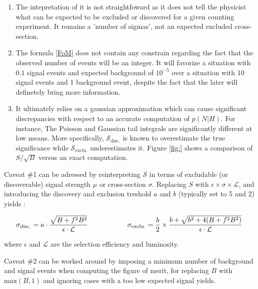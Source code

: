     \begin{enumerate}
        \item The intepretation of it is not straightfoward as it does not tell the 
              physicist what can be expected to be excluded or discovered 
              for a given counting experiment. It remains a 'number of sigmas', not an 
              expected excluded cross-section.
        \item The formula \ref{FoM} does not contain any constrain regarding the fact that
              the observed number of events will be an integer. It will favorize a situation
              with $0.1$ signal events and expected background of $10^{-5}$ over a 
              situation with 10 signal events and 1 background event, despite the fact that
              the later will definetely bring more information.
        \item It ultimately relies on a gaussian approximation which can cause significant
              discrepancies with respect to an accurate computation of $p(N|H)$. For instance,
              The Poisson and Gaussian tail integrals are significantly different at low
              means. More specifically, $\mathcal{S}_\text{disc.}$ is known to overestimate
              the true significance while $\mathcal{S}_\text{exclu.}$ underestimates it. 
              Figure \ref{fig:} shows a comparison of $S/\sqrt{B}$ versus an exact 
              computation.
    \end{enumerate}

    Caveat \#1 can be adressed by reinterpreting $\mathcal{S}$ in terms of excludable 
    (or discoverable) signal strength $\mu$ or cross-section $\sigma$. Replacing 
    $S$ with $\epsilon \times \sigma \times \mathcal{L}$, and introducing the discovery 
    and exclusion treshold $a$ and $b$ (typically set to 5 and 2) yields :

    \begin{equation}
        \mathcal{\sigma}_\text{disc.} = a \cdot \frac{\sqrt{B+f^2B^2}}{\epsilon \cdot \mathcal{L}}
       \hspace*{2cm} 
       \mathcal{\sigma}_\text{exclu.} = \frac{b}{2} \times \frac{b + \sqrt{b^2 + 4 (B + f^2B^2)}}{\epsilon \cdot \mathcal{L}}
       \label{FoM2}
    \end{equation}

    where $\epsilon$ and $\mathcal{L}$ are the selection efficiency and luminosity.

    Caveat \#2 can be worked around by imposing a minimum number of background and signal
    events when computing the figure of merit, for replacing $B$ with $\text{max}(B,1)$
    and ignoring cases with a too low expected signal yields.

